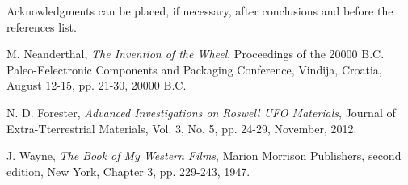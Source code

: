 \documentclass[a4paper,10pt]{article}
\begin{document}
\begin{acknowledgment}
Acknowledgments can be placed, if necessary, after conclusions and before the
references list. 
\end{acknowledgment}

\begin{thebibliography}{9}
    M. Neanderthal, \textit{The Invention of the Wheel}, Proceedings of the 20000 B.C. Paleo-Eelectronic Components and Packaging Conference, Vindija, Croatia, August 12-15, pp. 21-30, 20000 B.C.
    
    N. D. Forester, \textit{Advanced Investigations on Roswell UFO Materials}, Journal of Extra-Tterrestrial Materials, Vol. 3, No. 5, pp. 24-29, November, 2012.
    
    J. Wayne, \textit{The Book of My Western Films}, Marion Morrison Publishers, second edition, New York, Chapter 3, pp. 229-243, 1947.
\end{thebibliography}
\end{document}
